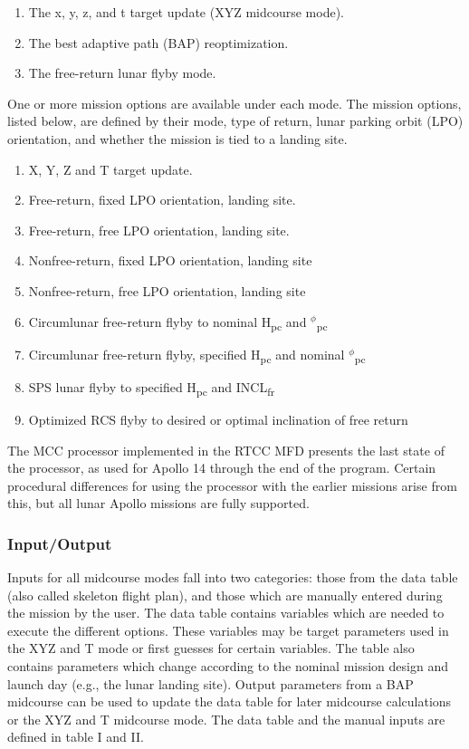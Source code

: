 \documentclass[11pt]{article} %
\begin{document}
\begin{enumerate}
	\item The x, y, z, and t target update (XYZ midcourse mode).
	\item The best adaptive path (BAP) reoptimization.
	\item The free-return lunar flyby mode.
\end{enumerate}

One or more mission options are available under each mode. The mission options, listed below, are defined by their mode, type of return, lunar parking orbit (LPO) orientation, and whether the mission is tied to a landing site.

\begin{enumerate}
	\item X, Y, Z and T target update.
	\item Free-return, fixed LPO orientation, landing site.
	\item Free-return, free LPO orientation, landing site.
	\item	Nonfree-return, fixed LPO orientation, landing site
	\item	Nonfree-return, free LPO orientation, landing site
	\item	Circumlunar free-return flyby to nominal H\textsubscript{pc} and $^{\phi}$\textsubscript{pc}
	\item	Circumlunar free-return flyby, specified H\textsubscript{pc} and nominal $^{\phi}$\textsubscript{pc}
	\item	SPS lunar flyby to specified H\textsubscript{pc} and INCL\textsubscript{fr}
	\item	Optimized RCS flyby to desired or optimal inclination of free return
\end{enumerate}

The MCC processor implemented in the RTCC MFD presents the last state of the processor, as used for Apollo 14 through the end of the program. Certain procedural differences for using the processor with the earlier missions arise from this, but all lunar Apollo missions are fully supported.

\subsubsection{Input/Output}

Inputs for all midcourse modes fall into two categories: those from the data table (also called skeleton flight plan), and those which are manually entered during the mission by the user. The data table contains variables which are needed to execute the different options. These variables may be target parameters used in the XYZ and T mode or first guesses for certain variables. The table also contains parameters which change according to the nominal mission design and launch day (e.g., the lunar landing site). Output parameters from a BAP midcourse can be used to update the data table for later midcourse calculations or the XYZ and T midcourse mode. The data table and the manual inputs are defined in table I and II.\\
\end{document}
